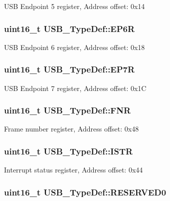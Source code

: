 U\-S\-B Endpoint 5 register, Address offset\-: 0x14 \hypertarget{struct_u_s_b___type_def_a2a8eba97668e6960f5c3836bdecbe210}{
\subsubsection[{E\-P6\-R}]{ uint16\-\_\-t U\-S\-B\-\_\-\-Type\-Def\-::\-E\-P6\-R}}\label{struct_u_s_b___type_def_a2a8eba97668e6960f5c3836bdecbe210}
U\-S\-B Endpoint 6 register, Address offset\-: 0x18 \hypertarget{struct_u_s_b___type_def_a2b9ef7debd928ed814c6349452a6453b}{
\subsubsection[{E\-P7\-R}]{ uint16\-\_\-t U\-S\-B\-\_\-\-Type\-Def\-::\-E\-P7\-R}}\label{struct_u_s_b___type_def_a2b9ef7debd928ed814c6349452a6453b}
U\-S\-B Endpoint 7 register, Address offset\-: 0x1\-C \hypertarget{struct_u_s_b___type_def_aea51e93434766c9507d6a3911a0e7e91}{
\subsubsection[{F\-N\-R}]{ uint16\-\_\-t U\-S\-B\-\_\-\-Type\-Def\-::\-F\-N\-R}}\label{struct_u_s_b___type_def_aea51e93434766c9507d6a3911a0e7e91}
Frame number register, Address offset\-: 0x48 \hypertarget{struct_u_s_b___type_def_a345a18bbd483ef44e3c2530a5c7cccfb}{
\subsubsection[{I\-S\-T\-R}]{ uint16\-\_\-t U\-S\-B\-\_\-\-Type\-Def\-::\-I\-S\-T\-R}}\label{struct_u_s_b___type_def_a345a18bbd483ef44e3c2530a5c7cccfb}
Interrupt status register, Address offset\-: 0x44 \hypertarget{struct_u_s_b___type_def_abaadc15d64249004eafbed98f8d9236c}{
\subsubsection[{R\-E\-S\-E\-R\-V\-E\-D0}]{ uint16\-\_\-t U\-S\-B\-\_\-\-Type\-Def\-::\-R\-E\-S\-E\-R\-V\-E\-D0}}\label{struct_u_s_b___type_def_abaadc15d64249004eafbed98f8d9236c}
